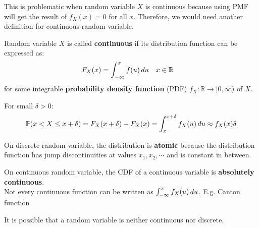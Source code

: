 \documentclass{huhtakm-template-book}
\newcommand{\prob}{\mathbb{P}}
\begin{document}
    This is problematic when random variable $X$ is continuous because using PMF will get the result of $f_{X}(x)=0$ for all $x$. Therefore, we would need another definition for continuous random variable.
    \begin{defn}
        Random variable $X$ is called \textbf{continuous} if its distribution function can be expressed as:
        \begin{align*}
            F_{X}(x)&=\int_{-\infty}^{x}f(u)\,du & x&\in\mathbb{R}
        \end{align*}
        for some integrable \textbf{probability density function} (PDF) $f_{X}:\mathbb{R}\to [0,\infty)$ of $X$. 
    \end{defn}
    \begin{rem}
        For small $\delta>0$:
        \begin{equation*}
            \prob(x<X\leq x+\delta)=F_{X}(x+\delta)-F_{X}(x)=\intlu{x}{x+\delta}f_{X}(u)\,du\approx f_{X}(x)\delta
        \end{equation*}
    \end{rem}
    \begin{rem}
        On discrete random variable, the distribution is \textbf{atomic} because the distribution function has jump discontinuities at values $x_{1},x_{2},\cdots$ and is constant in between.
    \end{rem}
    \begin{rem}
        On continuous random variable, the CDF of a continuous variable is \textbf{absolutely continuous}.\\
        Not every continuous function can be written as $\int_{-\infty}^{x}f_{X}(u)\,du$. E.g. Canton function
    \end{rem}
    \begin{rem}
        It is possible that a random variable is neither continuous nor discrete.
    \end{rem}
\end{document}
